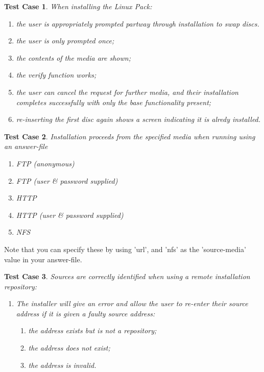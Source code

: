 \documentclass[a4paper]{article}
\newtheorem{testcase}{Test Case}
\begin{document}
\begin{testcase}
When installing the Linux Pack:
\begin{enumerate}
\item the user is appropriately prompted partway through installation
to swap discs.
\item the user is only prompted once;
\item the contents of the media are shown;
\item the verify function works;
\item the user can cancel the request for further media, and their
  installation completes successfully with only the base functionality
  present;
\item re-inserting the first disc again shows a screen indicating it
  is alredy installed.
\end{enumerate}
\end{testcase}

\begin{testcase}
Installation proceeds from the specified media when running using an
answer-file
\begin{enumerate}
\item FTP (anonymous)
\item FTP (user \& password supplied)
\item HTTP
\item HTTP (user \& password supplied)
\item NFS
\end{enumerate}
\end{testcase}
Note that you can specify these by using 'url', and 'nfs' as
the 'source-media' value in your answer-file.

\begin{testcase}
Sources are correctly identified when using a remote installation
repository:
\begin{enumerate}
\item The installer will give an error and allow the user to re-enter
  their source address if it is given a faulty source address:
  \begin{enumerate}
  \item the address exists but is not a repository;
  \item the address does not exist;
  \item the address is invalid.
  \end{enumerate}
\end{enumerate}
\end{testcase}
\end{document}
